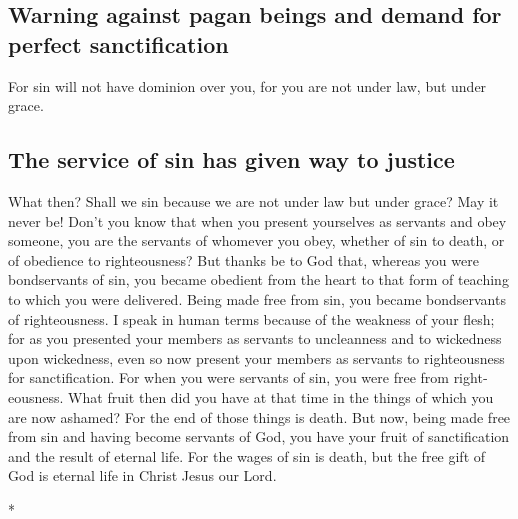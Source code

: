 \begin{paracol}{2}
\begin{otherlanguage}{english}
\hypertarget{warning-against-pagan-beings-and-demand-for-perfect-sanctification}{%
\subsection{Warning against pagan beings and demand for perfect
sanctification}\label{warning-against-pagan-beings-and-demand-for-perfect-sanctification}}

 For sin will not have dominion over you, for you are not
under law, but under grace.

\hypertarget{the-service-of-sin-has-given-way-to-justice}{%
\subsection{The service of sin has given way to
justice}\label{the-service-of-sin-has-given-way-to-justice}}

 What then? Shall we sin because we are not under law but
under grace? May it never be!  Don't you know that when
you present yourselves as servants and obey someone, you are the
servants of whomever you obey, whether of sin to death, or of obedience
to righteousness?  But thanks be to God that, whereas you
were bondservants of sin, you became obedient from the heart to that
form of teaching to which you were delivered.  Being made
free from sin, you became bondservants of righteousness. 
I speak in human terms because of the weakness of your flesh; for as you
presented your members as servants to uncleanness and to wickedness upon
wickedness, even so now present your members as servants to
righteousness for sanctification.  For when you were
servants of sin, you were free from righteousness.  What
fruit then did you have at that time in the things of which you are now
ashamed? For the end of those things is death.  But now,
being made free from sin and having become servants of God, you have
your fruit of sanctification and the result of eternal life.
 For the wages of sin is death, but the free gift of God
is eternal life in Christ Jesus our Lord.

\end{otherlanguage}

\switchcolumn[0]*

\hypertarget{cuando-hemos-muerto-y-resucitado-con-cristo-estamos-leguxedtimamente-libres-de-la-ley-y-estamos-obligados-a-servir-al-cristo-resucitado-creyuxe9ndonos-muertos-al-pecado}{%
}
\end{paracol}
